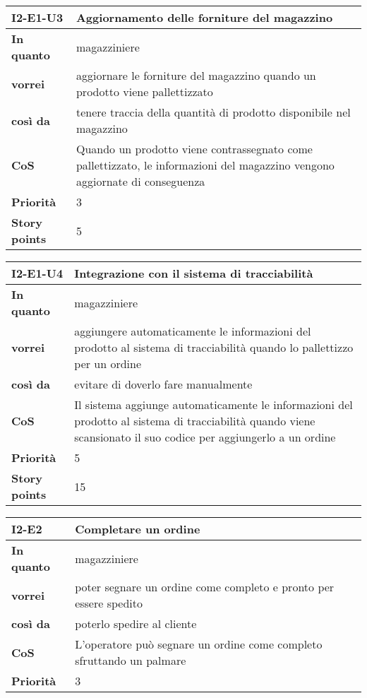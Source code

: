 \begin{table}[H]
  \begin{tabularx}{\textwidth}{lX}
    \toprule
    \textbf{I2-E1-U3} & \textbf{Aggiornamento delle forniture del magazzino} \\
    \midrule
    \textbf{In quanto} & magazziniere \\
    \textbf{vorrei} & aggiornare le forniture del magazzino quando un prodotto viene pallettizzato \\
    \textbf{così da} & tenere traccia della quantità di prodotto disponibile nel magazzino \\
    \midrule
    \textbf{CoS} & Quando un prodotto viene contrassegnato come pallettizzato, le informazioni del magazzino vengono aggiornate di conseguenza \\
    \midrule
    \textbf{Priorità} & 3 \\
    \textbf{Story points} & 5 \\
    \bottomrule
  \end{tabularx}
  \label{user-story:i2-e1-u3}
\end{table}

\begin{table}[H]
  \begin{tabularx}{\textwidth}{lX}
    \toprule
    \textbf{I2-E1-U4} & \textbf{Integrazione con il sistema di tracciabilità} \\
    \midrule
    \textbf{In quanto} & magazziniere \\
    \textbf{vorrei} & aggiungere automaticamente le informazioni del prodotto al sistema di tracciabilità quando lo pallettizzo per un ordine \\
    \textbf{così da} & evitare di doverlo fare manualmente \\
    \midrule
    \textbf{CoS} & Il sistema aggiunge automaticamente le informazioni del prodotto al sistema di tracciabilità quando viene scansionato il suo codice per aggiungerlo a un ordine \\
    \midrule
    \textbf{Priorità} & 5 \\
    \textbf{Story points} & 15 \\
    \bottomrule
  \end{tabularx}
  \label{user-story:i2-e1-u4}
\end{table}

\begin{table}[H]
  \begin{tabularx}{\textwidth}{lX}
    \toprule
    \textbf{I2-E2} & \textbf{Completare un ordine} \\
    \midrule
    \textbf{In quanto} & magazziniere \\
    \textbf{vorrei} & poter segnare un ordine come completo e pronto per essere spedito \\
    \textbf{così da} & poterlo spedire al cliente \\
    \midrule
    \textbf{CoS} & L'operatore può segnare un ordine come completo sfruttando un palmare \\
    \midrule
    \textbf{Priorità} & 3 \\
    \bottomrule
  \end{tabularx}
  \label{user-story:i2-e2}
\end{table}

